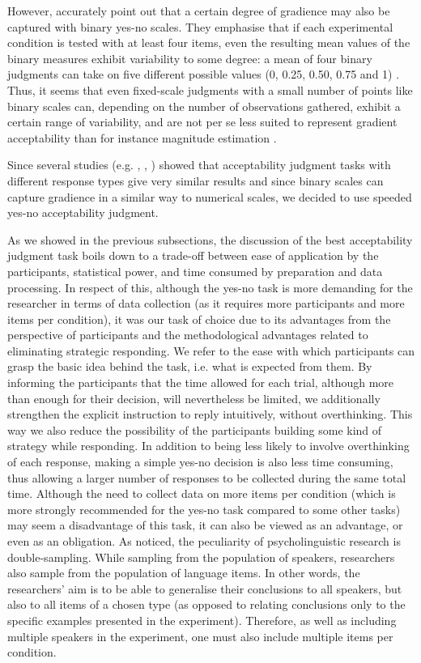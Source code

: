 However, \citet[253]{WeskottFanselow11} accurately point out that a certain degree of gradience may also be captured with binary yes-no scales. They emphasise that if each experimental condition is tested with at least four items, even the resulting mean values of the binary measures exhibit variability to some degree: a mean of four binary judgments can take on five different possible values (0, 0.25, 0.50, 0.75 and 1) \citep[253]{WeskottFanselow11}. Thus, it seems that even fixed-scale judgments with a small number of points like binary scales can, depending on the number of observations gathered, exhibit a certain range of variability, and are not per se less suited to represent gradient acceptability than for instance magnitude estimation \citep[253]{WeskottFanselow11}.

Since several studies (e.g. \citealt{BaderHaussler10}, \citealt{WeskottFanselow11}, \citealt{FGMB12}) showed that acceptability judgment tasks with different response types give very similar results and since binary scales can capture gradience in a similar way to numerical scales, we decided to use speeded yes-no acceptability judgment. 

As we showed in the previous subsections, the discussion of the best acceptability judgment task boils down to a trade-off between ease of application by the participants, statistical power, and time consumed by preparation and data processing. In respect of this, although the yes-no task is more demanding for the researcher in terms of data collection (as it requires more participants and more items per condition), it was our task of choice due to its advantages from the perspective of participants and the methodological advantages related to eliminating strategic responding. We refer to the ease with which participants can grasp the basic idea behind the task, i.e. what is expected from them. By informing the participants that the time allowed for each trial, although more than enough for their decision, will nevertheless be limited, we additionally strengthen the explicit instruction to reply intuitively, without overthinking. This way we also reduce the possibility of the participants building some kind of strategy while responding. In addition to being less likely to involve overthinking of each response, making a simple yes-no decision is also less time consuming, thus allowing a larger number of responses to be collected during the same total time. Although the need to collect data on more items per condition (which is more strongly recommended for the yes-no task compared to some other tasks) may seem a disadvantage of this task, it can also be viewed as an advantage, or even as an obligation. As \citet{Clark73} noticed, the peculiarity of psycholinguistic research is double-sampling. While sampling from the population of speakers, researchers also sample from the population of language items. In other words, the researchers’ aim is to be able to generalise their conclusions to all speakers, but also to all items of a chosen type (as opposed to relating conclusions only to the specific examples presented in the experiment). Therefore, as well as including multiple speakers in the experiment, one must also include multiple items per condition. 

